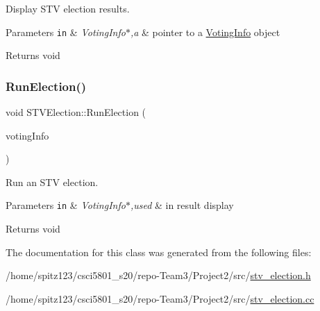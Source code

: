 Display S\+TV election results. 


\begin{DoxyParams}[1]{Parameters}
\mbox{\tt in}  & {\em Voting\+Info$\ast$,a} & pointer to a \hyperlink{classVotingInfo}{Voting\+Info} object \\
\hline
\end{DoxyParams}
\begin{DoxyReturn}{Returns}
void 
\end{DoxyReturn}
\mbox{\label{classSTVElection_a5b72107678148a378c2c6f2ea674f344}} 
\subsubsection{\texorpdfstring{Run\+Election()}{RunElection()}}
{\footnotesize\ttfamily void S\+T\+V\+Election\+::\+Run\+Election (\begin{DoxyParamCaption}\item[{\hyperlink{classVotingInfo}{Voting\+Info} $\ast$}]{voting\+Info }\end{DoxyParamCaption})}



Run an S\+TV election. 


\begin{DoxyParams}[1]{Parameters}
\mbox{\tt in}  & {\em Voting\+Info$\ast$,used} & in result display\\
\hline
\end{DoxyParams}
\begin{DoxyReturn}{Returns}
void 
\end{DoxyReturn}


The documentation for this class was generated from the following files\+:\begin{DoxyCompactItemize}
\item 
/home/spitz123/csci5801\+\_\+s20/repo-\/\+Team3/\+Project2/src/\hyperlink{stv__election_8h}{stv\+\_\+election.\+h}\item 
/home/spitz123/csci5801\+\_\+s20/repo-\/\+Team3/\+Project2/src/\hyperlink{stv__election_8cc}{stv\+\_\+election.\+cc}\end{DoxyCompactItemize}
